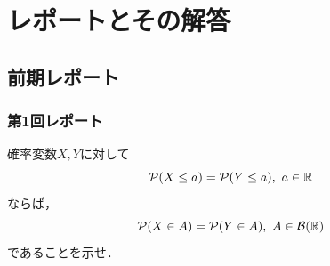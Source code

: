 \documentclass[dvipdfmx, leqno]{jsbook}
\begin{document}
\part{レポートとその解答}
\chapter{前期レポート}
\section{第1回レポート}
\begin{tcolorbox}
	確率変数$X, Y$に対して
\begin{equation*}
	\mathcal{P}(X\le a)= \mathcal{P}(Y\le a),\ a\in \R
\end{equation*}
	ならば，
\begin{equation*}
	\mathcal{P}(X\in A)= \mathcal{P}(Y\in A),\ A\in \mathcal{B}(\mathbb{R})
\end{equation*}
	であることを示せ．
\end{tcolorbox}
\end{document}
